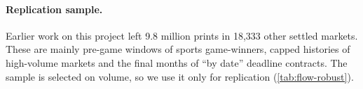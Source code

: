 \paragraph{Replication sample.} Earlier work on this project left 9.8 million prints in 18,333
other settled markets. These are mainly pre-game windows of sports game-winners, capped
histories of high-volume markets and the final months of ``by date'' deadline contracts. The
sample is selected on volume, so we use it only for replication (\cref{tab:flow-robust}).
